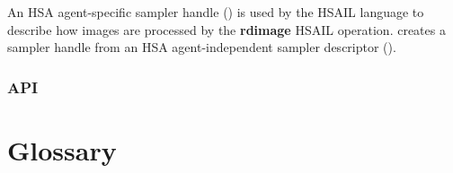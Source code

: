 \documentclass[final,oneside]{book}
\newcommand{\reffun}[1]{\textbf{#1}}
\newcommand{\refhsl}[1]{\reffun{#1}}
\begin{document}
An HSA agent-specific sampler handle () is used
by the HSAIL language to describe how images are processed by the
\refhsl{rdimage} HSAIL operation.  creates
a sampler handle from an HSA agent-independent sampler descriptor
().

\subsection{API}




\appendix
\chapter{Glossary}
\end{document}
